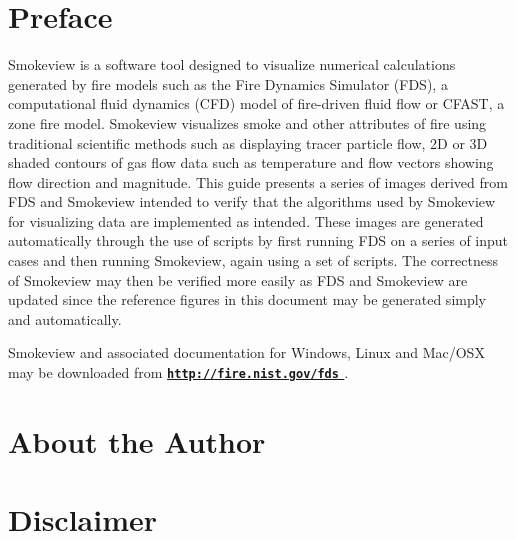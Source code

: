 \documentclass[11pt,twoside]{book}
\newcommand{\hhref}[1]{\href{#1}{{\tt #1}
}}
\begin{document}
\chapter{Preface}
Smokeview is a software tool designed to visualize numerical
calculations generated by fire models such as the Fire Dynamics Simulator (FDS),
a computational fluid dynamics (CFD) model of fire-driven fluid
flow or CFAST, a zone fire model. Smokeview visualizes smoke and other attributes of fire
using traditional scientific methods such as displaying tracer
particle flow, 2D or 3D shaded contours of gas flow data such as
temperature and flow vectors showing flow direction and magnitude.
This guide presents a series of images derived from FDS and Smokeview intended to verify that the algorithms used by Smokeview for visualizing data are implemented as intended.  These images are generated automatically through the use of scripts by first running FDS on a series of input cases and then running Smokeview, again using a set of scripts.  The correctness of Smokeview may then be verified more easily as FDS and Smokeview are updated since the reference figures in this document may be generated simply and automatically.

Smokeview and associated
documentation for Windows, Linux and Mac/OSX may be downloaded from  {\bf
\hhref{http://fire.nist.gov/fds}} .


\chapter{About the Author}
\begin{description}

\end{description}


\chapter{Disclaimer}
\end{document}
